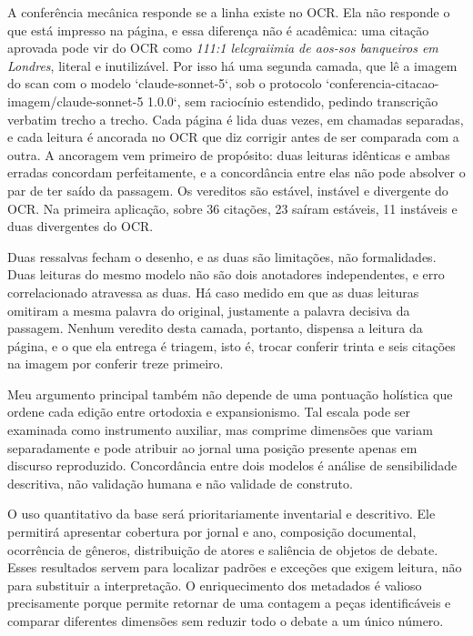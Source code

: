 A conferência mecânica responde se a linha existe no OCR. Ela não responde o que está impresso na página, e essa diferença não é acadêmica: uma citação aprovada pode vir do OCR como \textit{111:1 lelcgraiimia de aos-sos banqueiros em Londres}, literal e inutilizável. Por isso há uma segunda camada, que lê a imagem do scan com o modelo `claude-sonnet-5`, sob o protocolo `conferencia-citacao-imagem/claude-sonnet-5 1.0.0`, sem raciocínio estendido, pedindo transcrição verbatim trecho a trecho. Cada página é lida duas vezes, em chamadas separadas, e cada leitura é ancorada no OCR que diz corrigir antes de ser comparada com a outra. A ancoragem vem primeiro de propósito: duas leituras idênticas e ambas erradas concordam perfeitamente, e a concordância entre elas não pode absolver o par de ter saído da passagem. Os vereditos são estável, instável e divergente do OCR. Na primeira aplicação, sobre 36 citações, 23 saíram estáveis, 11 instáveis e duas divergentes do OCR.

Duas ressalvas fecham o desenho, e as duas são limitações, não formalidades. Duas leituras do mesmo modelo não são dois anotadores independentes, e erro correlacionado atravessa as duas. Há caso medido em que as duas leituras omitiram a mesma palavra do original, justamente a palavra decisiva da passagem. Nenhum veredito desta camada, portanto, dispensa a leitura da página, e o que ela entrega é triagem, isto é, trocar conferir trinta e seis citações na imagem por conferir treze primeiro.

Meu argumento principal também não depende de uma pontuação holística que ordene cada edição entre ortodoxia e expansionismo. Tal escala pode ser examinada como instrumento auxiliar, mas comprime dimensões que variam separadamente e pode atribuir ao jornal uma posição presente apenas em discurso reproduzido. Concordância entre dois modelos é análise de sensibilidade descritiva, não validação humana e não validade de construto.


O uso quantitativo da base será prioritariamente inventarial e descritivo. Ele permitirá apresentar cobertura por jornal e ano, composição documental, ocorrência de gêneros, distribuição de atores e saliência de objetos de debate. Esses resultados servem para localizar padrões e exceções que exigem leitura, não para substituir a interpretação. O enriquecimento dos metadados é valioso precisamente porque permite retornar de uma contagem a peças identificáveis e comparar diferentes dimensões sem reduzir todo o debate a um único número.

